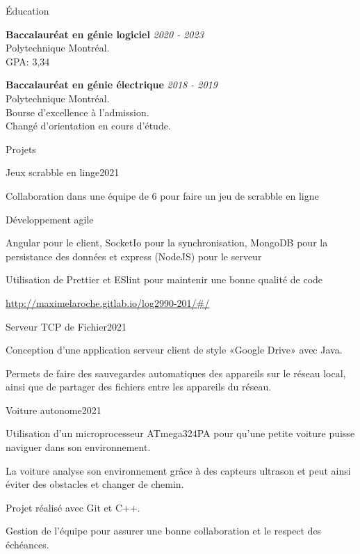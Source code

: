 \documentclass[french,12pt]{resume} %
\begin{document}
	\begin{rSection}{Éducation}
		
		{\bf Baccalauréat en génie logiciel} \hfill {\em  2020 - 2023} 
		\\ Polytechnique Montréal.
		\\GPA: 3,34 
		
		
		{\bf Baccalauréat en génie électrique} \hfill {\em  2018 - 2019} 
		\\ Polytechnique Montréal.
		\\ Bourse d'excellence à l'admission.
		\\ Changé d'orientation en cours d'étude.
		
	\end{rSection}
	
	
	\begin{rSection}{Projets}

		\begin{rSubsection}{Jeux scrabble en linge}{2021}{}{}
			\item   Collaboration dans une équipe de 6 pour faire un jeu de scrabble en ligne
			\item Développement agile
			\item Angular pour le client, SocketIo pour la synchronisation, MongoDB pour la persistance des données et express (NodeJS) pour le serveur
			\item Utilisation de Prettier et ESlint pour maintenir une bonne qualité de code
			\item \url{http://maximelaroche.gitlab.io/log2990-201/#/}
		\end{rSubsection}
		\begin{rSubsection}{Serveur TCP de Fichier}{2021}{}{}
			\item Conception d'une application serveur client de style «Google Drive» avec Java.
			\item Permets de faire des sauvegardes automatiques des appareils sur le réseau local, ainsi que de partager des fichiers entre les appareils du réseau.
		\end{rSubsection}
		 \begin{rSubsection}{Voiture autonome}{2021}{}{}
			\item Utilisation d'un microprocesseur ATmega324PA pour qu'une petite voiture puisse naviguer dans son environnement.
			\item La voiture analyse son environnement grâce à des capteurs ultrason et peut ainsi éviter des obstacles et changer de chemin.
			\item Projet réalisé avec Git et C++.
			\item Gestion de l'équipe pour assurer une bonne collaboration et le respect des échéances.
			 
		 \end{rSubsection}


		
	\end{rSection}
	
\end{document}
